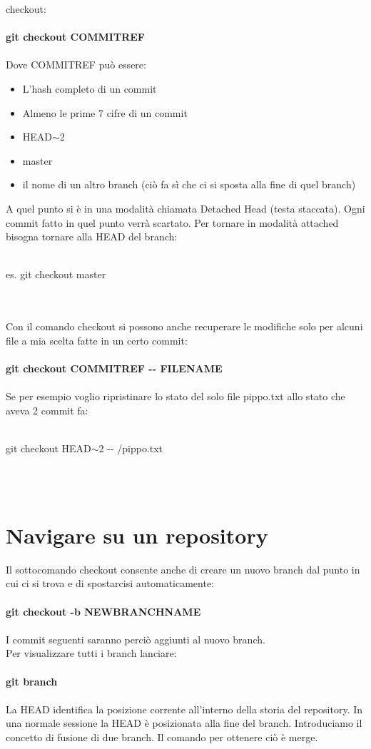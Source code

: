 \documentclass[a4paper,12pt]{report}
\begin{document}
checkout:
\\\\
\textbf{git checkout COMMITREF}
\\\\
Dove COMMITREF può essere:
\begin{itemize}
\item L'hash completo di un commit
\item Almeno le prime 7 cifre di un commit
\item HEAD$\sim$2
\item master
\item il nome di un altro branch (ciò fa sì che ci si sposta alla fine di quel branch)
\end{itemize}
A quel punto si è in una modalità chiamata Detached Head (testa staccata). Ogni commit fatto in quel punto verrà scartato. Per tornare in modalità attached bisogna tornare alla HEAD del branch:
\\\\
\centerline{es. git checkout master}
\\\\
Con il comando checkout si possono anche recuperare le modifiche solo per alcuni file a mia scelta fatte in un certo commit:
\\\\
\textbf{git checkout COMMITREF -{}- FILENAME}
\\\\
Se per esempio voglio ripristinare lo stato del solo file pippo.txt allo stato che aveva 2 commit fa:
\\\\
\centerline{git checkout HEAD$\sim$2 -{}- /pippo.txt}
\\\\
\chapter{Navigare su un repository}
Il sottocomando checkout consente anche di creare un nuovo branch dal punto in cui ci si trova e di spostarcisi automaticamente:
\\\\
\textbf{git checkout -b NEWBRANCHNAME}
\\\\
I commit seguenti saranno perciò aggiunti al nuovo branch.
\\
Per visualizzare tutti i branch lanciare:
\\\\
\textbf{git branch}
\\\\
La HEAD identifica la posizione corrente all'interno della storia del repository. In una normale sessione la HEAD è posizionata alla fine del branch.
Introduciamo il concetto di fusione di due branch. Il comando per ottenere ciò è merge.
\end{document}
